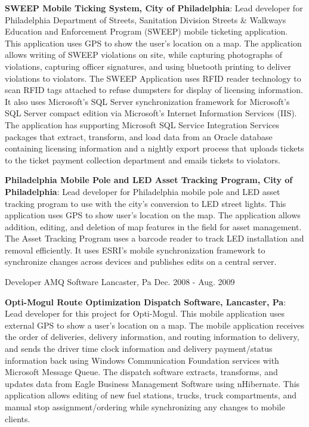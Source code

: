 \begin{cventries}
{\begin{cvitems}
        \bigskip
        \item{\textbf{SWEEP Mobile Ticking System, City of Philadelphia}: Lead developer for Philadelphia Department of Streets, Sanitation Division Streets \& Walkways Education and Enforcement Program (SWEEP) mobile ticketing application. This application uses GPS to show the user’s location on a map. The application allows writing of SWEEP violations on site, while capturing photographs of violations, capturing officer signatures, and using bluetooth printing to deliver violations to violators. The SWEEP Application uses RFID reader technology to scan RFID tags attached to refuse dumpsters for display of licensing information. It also uses Microsoft’s SQL Server synchronization framework for Microsoft’s SQL Server compact edition via Microsoft’s Internet Information Services (IIS). The application has supporting Microsoft SQL Service Integration Services packages that extract, transform, and load data from an Oracle database containing licensing information and a nightly export process that uploads tickets to the ticket payment collection department and emails tickets to violators.}
        \bigskip
        \item{\textbf{Philadelphia Mobile Pole and LED Asset Tracking Program, City of Philadelphia}: Lead developer for Philadelphia mobile pole and LED asset tracking program to use with the city’s conversion to LED street lights. This application uses GPS to show user’s location on the map. The application allows addition, editing, and deletion of map features in the field for asset management. The Asset Tracking Program uses a barcode reader to track LED installation and removal efficiently. It uses ESRI’s mobile synchronization framework to synchronize changes across devices and publishes edits on a central server.}
      \end{cvitems}
    }
  \cventry
    {Developer}
    {AMQ Software}
    {Lancaster, Pa}
    {Dec. 2008 - Aug. 2009}
    {
      \begin{cvitems}
        \item {\textbf{Opti-Mogul Route Optimization Dispatch Software, Lancaster, Pa}: Lead developer for this project for Opti-Mogul. This mobile application uses external GPS to show a user’s location on a map. The mobile application receives the order of deliveries, delivery information, and routing information to delivery, and sends the driver time clock information and delivery payment/status information back using Windows Communication Foundation services with Microsoft Message Queue. The dispatch software extracts, transforms, and updates data from Eagle Business Management Software using nHibernate. This application allows editing of new fuel stations, trucks, truck compartments, and manual stop assignment/ordering while synchronizing any changes to mobile clients.}

\end{cvitems}}
\end{cventries}
